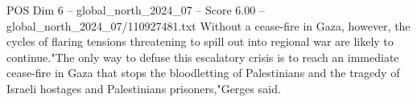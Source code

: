 \begin{textsample}{POS Dim 6 – global\_north\_2024\_07 – Score 6.00 – global\_north\_2024\_07/110927481.txt}
Without a cease-fire in Gaza, however, the cycles of flaring tensions threatening to spill out into regional war are likely to continue."The only way to defuse this escalatory crisis is to reach an immediate cease-fire in Gaza that stops the bloodletting of Palestinians and the tragedy of Israeli hostages and Palestinians prisoners,"Gerges said.

\end{textsample}
